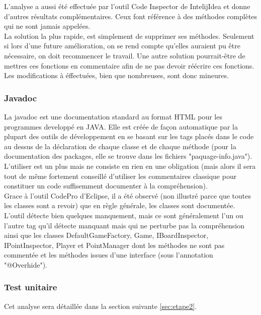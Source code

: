 \documentclass[12pt,a4paper,final]{article}
\begin{document}
L'analyse a aussi été effectuée par l'outil Code Inspector de IntelijIdea et donne d'autres résultats complémentaires. Ceux font référence à des méthodes complètes qui ne sont jamais appelées.\\
La solution la plus rapide, est simplement de supprimer ses méthodes. Seulement si lors d'une future amélioration, on se rend compte qu'elles auraient pu être nécessaire, on doit recommencer le travail. Une autre solution pourrait-être de mettres ces fonctions en commentaire afin de ne pas devoir réécrire ces fonctions.\\
Les modifications à éffectuées, bien que nombreuses, sont donc mineures.


\subsubsection{Javadoc}\label{javadoc}
La javadoc est une documentation standard au format HTML pour les programmes developpé en JAVA. Elle est créée de façon automatique par la plupart des outils de développement en se basant sur les tags placés dans le code au dessus de la déclaration de chaque classe et de chaque méthode (pour la documentation des packages, elle se trouve dans les fichiers "paquage-info.java").
L'utiliser est un plus mais ne consiste en rien en une obligation (mais alors il sera tout de même fortement conseillé d'utiliser les commentaires classique pour constituer un code suffisemment documenter à la compréhension).\\
Grace à l'outil CodePro d'Eclipse, il a été observé (non illustré parce que toutes les classes sont a revoir) que en règle générale, les classes sont documentée. L'outil détecte bien quelques manquement, mais ce sont généralement l'un ou l'autre tag qu'il détecte manquant mais qui ne perturbe pas la compréhension ainsi que les classes DefaultGameFactory, Game, IBoardInspector, IPointInspector, Player et PointManager dont les méthodes ne sont pas commentée et les méthodes issues d'une interface (sous l'annotation "@Overhide").


\subsubsection{Test unitaire}
Cet analyse sera détaillée dans la section suivante \ref{sec:etape2}.
\end{document}
